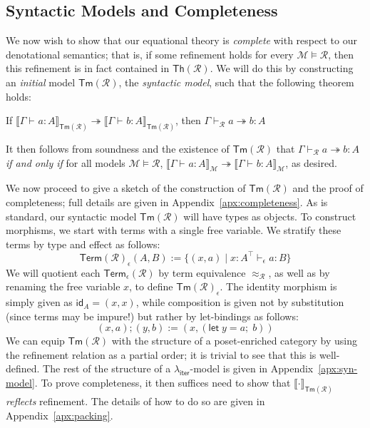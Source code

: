 \documentclass[acmsmall,screen,review]{acmart}
\newcommand{\mc}[1]{\ensuremath{\mathcal{#1}}}
\newcommand{\ms}[1]{\ensuremath{\mathsf{#1}}}
\newcommand{\letexpr}[3]{\ensuremath{\ms{let}\;#1 = #2;\;#3}}
\newcommand{\hasty}[4]{#1 \vdash_{#2} #3: {#4}}
\newcommand{\tref}{\twoheadrightarrow}
\newcommand{\tmle}[5]{#1 \vdash_{#2} #3 \tref #4 : {#5}}
\newcommand{\dnt}[1]{\llbracket{#1}\rrbracket}
\newcommand{\subiterexp}{\texorpdfstring{\(\lambda_{\ms{iter}}\)}{lambda-iter}}
\begin{document}
\subsection{Syntactic Models and Completeness}

We now wish to show that our equational theory is \emph{complete} with respect to our denotational
semantics; that is, if some refinement holds for every $\mc{M} \models \mc{R}$, then this refinement
is in fact contained in $\ms{Th}(\mc{R})$. We will do this by constructing an \emph{initial} model
$\ms{Tm}(\mc{R})$, the \emph{syntactic model}, such that the following theorem holds:
\begin{theorem}[Completeness]
  If $\dnt{\hasty{\Gamma}{}{a}{A}}_{\ms{Tm}(\mc{R})} \tref
  \dnt{\hasty{\Gamma}{}{b}{A}}_{\ms{Tm}(\mc{R})}$, then
  $
  \tmle{\Gamma}{\mc{R}}{a}{b}{A}
  $
\end{theorem}
It then follows from soundness and the existence of $\ms{Tm}(\mc{R})$ that
$\tmle{\Gamma}{\mc{R}}{a}{b}{A}$ \emph{if and only if} for all models $\mc{M} \models \mc{R}$,
$\dnt{\hasty{\Gamma}{}{a}{A}}_{\mc{M}} \tref \dnt{\hasty{\Gamma}{}{b}{A}}_{\mc{M}}$, as desired.

We now proceed to give a sketch of the construction of $\ms{Tm}(\mc{R})$ and the proof of 
completeness; full details are given in Appendix~\ref{apx:completeness}. As is standard, our 
syntactic model $\ms{Tm}(\mc{R})$ will have types as objects. To construct morphisms, we start with 
terms with a single free variable. We stratify these terms by type and effect as follows:
$$
\ms{Term}(\mc{R})_\epsilon(A, B) := \{(x, a) \mid \hasty{x : A^\top}{\epsilon}{a}{B}\}
$$
We will quotient each $\ms{Term}_\epsilon(\mc{R})$ by term equivalence $\approx_{\mc{R}}$, as well
as by renaming the free variable $x$, to define $\ms{Tm}(\mc{R})_\epsilon$. The identity morphism is
simply given as $\ms{id}_A = (x, x)$, while composition is given not by substitution (since terms
may be impure!) but rather by let-bindings as follows:
$$
(x, a) ; (y, b) := (x, (\letexpr{y}{a}{b}))
$$
We can equip $\ms{Tm}(\mc{R})$ with the structure of a poset-enriched category by using the
refinement relation as a partial order; it is trivial to see that this is well-defined. The rest of
the structure of a \subiterexp{}-model is given in Appendix~\ref{apx:syn-model}.
To prove completeness, it then suffices need to show that $\dnt{\cdot}_{\ms{Tm}(\mc{R})}$
\emph{reflects} refinement. The details of how to do so are given in Appendix~\ref{apx:packing}.
\end{document}
